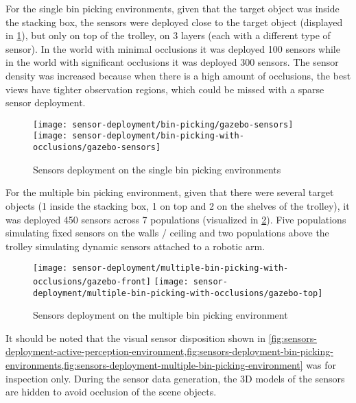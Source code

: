 For the single bin picking environments, given that the target object was inside the stacking box, the sensors were deployed close to the target object (displayed in \cref{fig:sensors-deployment-bin-picking-environments}), but only on top of the trolley, on 3 layers (each with a different type of sensor). In the world with minimal occlusions it was deployed 100 sensors while in the world with significant occlusions it was deployed 300 sensors. The sensor density was increased because when there is a high amount of occlusions, the best views have tighter observation regions, which could be missed with a sparse sensor deployment.

\begin{figure}
	\centering
	\texttt{[image: sensor-deployment/bin-picking/gazebo-sensors]}\hspace{1em}
	\texttt{[image: sensor-deployment/bin-picking-with-occlusions/gazebo-sensors]}
	\caption{Sensors deployment on the single bin picking environments}
	\label{fig:sensors-deployment-bin-picking-environments}
\end{figure}

For the multiple bin picking environment, given that there were several target objects (1 inside the stacking box, 1 on top and 2 on the shelves of the trolley), it was deployed 450 sensors across 7 populations (visualized in \cref{fig:sensors-deployment-multiple-bin-picking-environment}). Five populations simulating fixed sensors on the walls / ceiling and two populations above the trolley simulating dynamic sensors attached to a robotic arm.

\begin{figure}
	\centering
	\texttt{[image: sensor-deployment/multiple-bin-picking-with-occlusions/gazebo-front]}\hspace{0.25em}
	\texttt{[image: sensor-deployment/multiple-bin-picking-with-occlusions/gazebo-top]}
	\caption{Sensors deployment on the multiple bin picking environment}
	\label{fig:sensors-deployment-multiple-bin-picking-environment}
\end{figure}

It should be noted that the visual sensor disposition shown in \cref{fig:sensors-deployment-active-perception-environment,fig:sensors-deployment-bin-picking-environments,fig:sensors-deployment-multiple-bin-picking-environment} was for inspection only. During the sensor data generation, the 3D models of the sensors are hidden to avoid occlusion of the scene objects.
